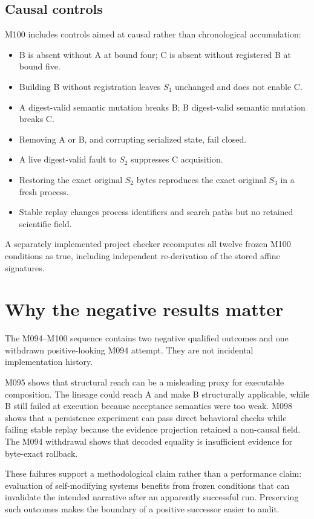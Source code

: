 \documentclass[10pt]{article}
\begin{document}
\subsection{Causal controls}
M100 includes controls aimed at causal rather than chronological accumulation:
\begin{itemize}
  \item B is absent without A at bound four; C is absent without registered B at bound five.
  \item Building B without registration leaves $S_1$ unchanged and does not enable C.
  \item A digest-valid semantic mutation breaks B; B digest-valid semantic mutation breaks C.
  \item Removing A or B, and corrupting serialized state, fail closed.
  \item A live digest-valid fault to $S_2$ suppresses C acquisition.
  \item Restoring the exact original $S_2$ bytes reproduces the exact original $S_3$ in a fresh process.
  \item Stable replay changes process identifiers and search paths but no retained scientific field.
\end{itemize}
A separately implemented project checker recomputes all twelve frozen M100 conditions as true, including independent re-derivation of the stored affine signatures.

\section{Why the negative results matter}
The M094--M100 sequence contains two negative qualified outcomes and one withdrawn positive-looking M094 attempt. They are not incidental implementation history.

M095 shows that structural reach can be a misleading proxy for executable composition. The lineage could reach A and make B structurally applicable, while B still failed at execution because acceptance semantics were too weak. M098 shows that a persistence experiment can pass direct behavioral checks while failing stable replay because the evidence projection retained a non-causal field. The M094 withdrawal shows that decoded equality is insufficient evidence for byte-exact rollback.

These failures support a methodological claim rather than a performance claim: evaluation of self-modifying systems benefits from frozen conditions that can invalidate the intended narrative after an apparently successful run. Preserving such outcomes makes the boundary of a positive successor easier to audit.
\end{document}

